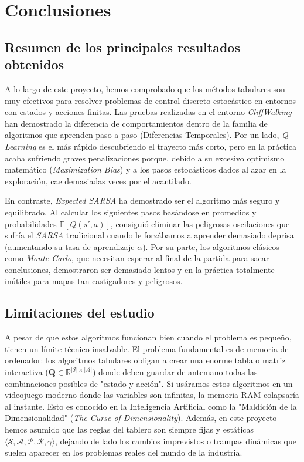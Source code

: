 \section{Conclusiones}

\subsection{Resumen de los principales resultados obtenidos}
A lo largo de este proyecto, hemos comprobado que los métodos tabulares son muy efectivos para resolver problemas de control discreto estocástico en entornos con estados y acciones finitas. Las pruebas realizadas en el entorno \textit{CliffWalking} han demostrado la diferencia de comportamientos dentro de la familia de algoritmos que aprenden paso a paso (Diferencias Temporales). Por un lado, \textit{Q-Learning} es el más rápido descubriendo el trayecto más corto, pero en la práctica acaba sufriendo graves penalizaciones porque, debido a su excesivo optimismo matemático (\textit{Maximization Bias}) y a los pasos estocásticos dados al azar en la exploración, cae demasiadas veces por el acantilado.

En contraste, \textit{Expected SARSA} ha demostrado ser el algoritmo más seguro y equilibrado. Al calcular los siguientes pasos basándose en promedios y probabilidades $\mathbb{E}[Q(s', a)]$, consiguió eliminar las peligrosas oscilaciones que sufría el \textit{SARSA} tradicional cuando le forzábamos a aprender demasiado deprisa (aumentando su tasa de aprendizaje $\alpha$). Por su parte, los algoritmos clásicos como \textit{Monte Carlo}, que necesitan esperar al final de la partida para sacar conclusiones, demostraron ser demasiado lentos y en la práctica totalmente inútiles para mapas tan castigadores y peligrosos.

\subsection{Limitaciones del estudio}
A pesar de que estos algoritmos funcionan bien cuando el problema es pequeño, tienen un límite técnico insalvable. El problema fundamental es de memoria de ordenador: los algoritmos tabulares obligan a crear una enorme tabla o matriz interactiva ($\mathbf{Q} \in \mathbb{R}^{|\mathcal{S}| \times |\mathcal{A}|}$) donde deben guardar de antemano todas las combinaciones posibles de "estado y acción". Si usáramos estos algoritmos en un videojuego moderno donde las variables son infinitas, la memoria RAM colapsaría al instante. Esto es conocido en la Inteligencia Artificial como la "Maldición de la Dimensionalidad" (\textit{The Curse of Dimensionality}).
Además, en este proyecto hemos asumido que las reglas del tablero son siempre fijas y estáticas $\langle \mathcal{S}, \mathcal{A}, \mathcal{P}, \mathcal{R}, \gamma \rangle$, dejando de lado los cambios imprevistos o trampas dinámicas que suelen aparecer en los problemas reales del mundo de la industria.

